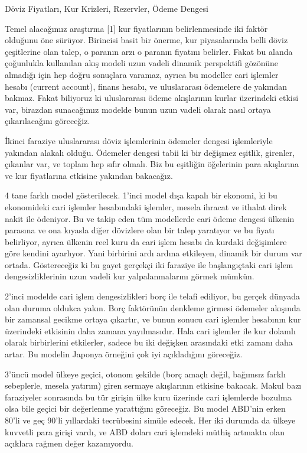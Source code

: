 \documentclass[12pt,fleqn]{article}\usepackage{../../common}
\begin{document}
Döviz Fiyatları, Kur Krizleri, Rezervler, Ödeme Dengesi

Temel alacağımız araştırma [1] kur fiyatlarının belirlenmesinde iki faktör
olduğunu öne sürüyor. Birincisi basit bir önerme, kur piyasalarında belli
döviz çeşitlerine olan talep, o paranın arzı o paranın fiyatını
belirler. Fakat bu alanda çoğunlukla kullanılan akış modeli uzun vadeli
dinamik perspektifi gözönüne almadığı için hep doğru sonuçlara varamaz,
ayrıca bu modeller cari işlemler hesabı (current account), finans hesabı,
ve uluslararası ödemelere de yakından bakmaz. Fakat biliyoruz ki
uluslararası ödeme akışlarının kurlar üzerindeki etkisi var, birazdan
sunacağımız modelde bunun uzun vadeli olarak nasıl ortaya çıkarılacağını
göreceğiz. 

İkinci faraziye uluslararası döviz işlemlerinin ödemeler dengesi
işlemleriyle yakından alakalı olduğu. Ödemeler dengesi tabii ki bir
değişmez eşitlik, girenler, çıkanlar var, ve toplam hep sıfır olmalı. Biz
bu eşitliğin öğelerinin para akışlarına ve kur fiyatlarına etkisine
yakından bakacağız.

4 tane farklı model gösterilecek. 1'inci model dışa kapalı bir ekonomi, ki
bu ekonomideki cari işlemler hesabındaki işlemler, mesela ihracat ve
ithalat direk nakit ile ödeniyor. Bu ve takip eden tüm modellerde cari
ödeme dengesi ülkenin parasına ve ona kıyasla diğer dövizlere olan bir
talep yaratıyor ve bu fiyatı belirliyor, ayrıca ülkenin reel kuru da cari
işlem hesabı da kurdaki değişimlere göre kendini ayarlıyor. Yani birbirini
ardı ardına etkileyen, dinamik bir durum var ortada. Göstereceğiz ki bu
gayet gerçekçi iki faraziye ile başlangıçtaki cari işlem dengesizliklerinin
uzun vadeli kur yalpalanmalarını görmek mümkün. 

2'inci modelde cari işlem dengesizlikleri borç ile telafi ediliyor, bu
gerçek dünyada olan duruma oldukca yakın. Borç faktörünün denkleme girmesi
ödemeler akışında bir zamansal gecikme ortaya çıkartır, ve bunun sonucu cari
işlemler hesabının kur üzerindeki etkisinin daha zamana yayılmasıdır. Hala
cari işlemler ile kur dolamlı olarak birbirlerini etkilerler, sadece bu iki
değişken arasındaki etki zamanı daha artar. Bu modelin Japonya örneğini çok
iyi açıkladığını göreceğiz. 

3'üncü model ülkeye geçici, otonom şekilde (borç amaçlı değil, bağımsız
farklı sebeplerle, mesela yatırım) giren sermaye akışlarının etkisine
bakacak. Makul bazı faraziyeler sonrasında bu tür girişin ülke kuru
üzerinde cari işlemlerde bozulma olsa bile geçici bir değerlenme
yarattığını göreceğiz. Bu model ABD'nin erken 80'li ve geç 90'li yıllardaki
tecrübesini simüle edecek. Her iki durumda da ülkeye kuvvetli para girişi
vardı, ve ABD doları cari işlemdeki müthiş artmakta olan açıklara rağmen
değer kazanıyordu. 
\end{document}
